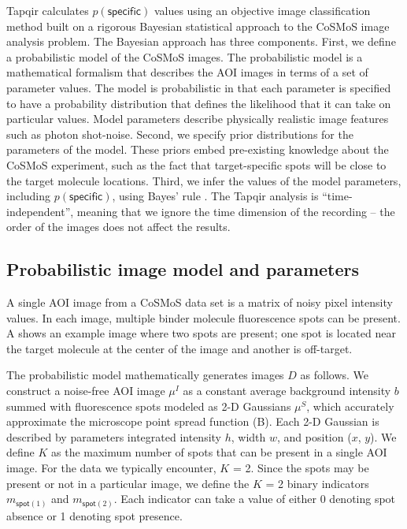 Tapqir calculates $p(\mathsf{specific})$ values using an objective image classification method built on a rigorous Bayesian statistical approach to the CoSMoS image analysis problem. The Bayesian approach has three components. First, we define a probabilistic model of the CoSMoS images. The probabilistic model is a mathematical formalism that describes the AOI images in terms of a set of parameter values.  The model is probabilistic in that each parameter is specified to have a probability distribution that defines the likelihood that it can take on particular values. Model parameters describe physically realistic image features such as photon shot-noise. Second, we specify prior distributions for the parameters of the model. These priors embed pre-existing knowledge about the CoSMoS experiment, such as the fact that target-specific spots will be close to the target molecule locations. Third, we infer the values of the model parameters, including $p(\mathsf{specific})$, using Bayes' rule \citep{Bishop2006-oa,Kinz-Thompson2021-tb}. The Tapqir analysis is “time-independent”, meaning that we ignore the time dimension of the recording -- the order of the images does not affect the results. 

\subsection{Probabilistic image model and parameters} %

A single AOI image from a CoSMoS data set is a matrix of noisy pixel intensity values.  In each image, multiple binder molecule fluorescence spots can be present. A shows an example image where two spots are present; one spot is located near the target molecule at the center of the image and another is off-target.

The probabilistic model mathematically generates images $D$ as follows.  We construct a noise-free AOI image $\mu^I$ as a constant average background intensity $b$ summed with fluorescence spots modeled as 2-D Gaussians $\mu^S$, which accurately approximate the microscope point spread function \citep{Zhang2007-rb} (B). Each 2-D Gaussian is described by parameters integrated intensity $h$, width $w$, and position ($x$, $y$). We define $K$ as the maximum number of spots that can be present in a single AOI image.  For the data we typically encounter, $K$ = 2. Since the spots may be present or not in a particular image, we define the $K$ = 2 binary indicators $m_{\mathsf{spot}(1)}$ and $m_{\mathsf{spot}(2)}$.  Each indicator can take a value of either 0 denoting spot absence or 1 denoting spot presence. 

